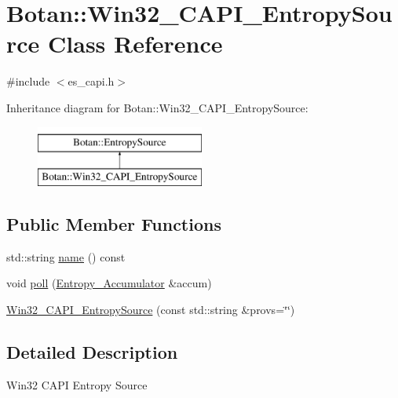 \hypertarget{classBotan_1_1Win32__CAPI__EntropySource}{\section{Botan\-:\-:Win32\-\_\-\-C\-A\-P\-I\-\_\-\-Entropy\-Source Class Reference}
\label{classBotan_1_1Win32__CAPI__EntropySource}
}


{\ttfamily \#include $<$es\-\_\-capi.\-h$>$}

Inheritance diagram for Botan\-:\-:Win32\-\_\-\-C\-A\-P\-I\-\_\-\-Entropy\-Source\-:\begin{figure}[H]
\begin{center}
\leavevmode
\includegraphics[height=2.000000cm]{classBotan_1_1Win32__CAPI__EntropySource}
\end{center}
\end{figure}
\subsection*{Public Member Functions}
\begin{DoxyCompactItemize}
\item 
std\-::string \hyperlink{classBotan_1_1Win32__CAPI__EntropySource_a8a0966105296ea2fb01dadef797f6243}{name} () const 
\item 
void \hyperlink{classBotan_1_1Win32__CAPI__EntropySource_a28990f4de199417e0ff5a57a9ae84361}{poll} (\hyperlink{classBotan_1_1Entropy__Accumulator}{Entropy\-\_\-\-Accumulator} \&accum)
\item 
\hyperlink{classBotan_1_1Win32__CAPI__EntropySource_a051f4a15f2ea96df044fc1d459c362d2}{Win32\-\_\-\-C\-A\-P\-I\-\_\-\-Entropy\-Source} (const std\-::string \&provs=\char`\"{}\char`\"{})
\end{DoxyCompactItemize}


\subsection{Detailed Description}
Win32 C\-A\-P\-I Entropy Source 

